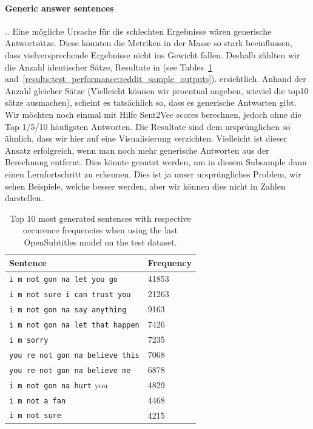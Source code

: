 \paragraph{Generic answer sentences}.. Eine mögliche Ursache für die schlechten Ergebnisse wären generische Antwortsätze. Diese könnten die Metriken in der Masse so stark beeinflussen, dass vielversprechende Ergebnisse nicht ins Gewicht fallen. Deshalb zählten wir die Anzahl identischer Sätze, Resultate in (see Tables~\ref{results:test_performance:opensubtitles_sample_outputs} and~\ref{results:test_performance:reddit_sample_outputs}). ersichtlich. Anhand der Anzahl gleicher Sätze (Vielleicht können wir proentual angeben, wieviel die top10 sätze ausmachen), scheint es tatsächlich so, dass es generische Antworten gibt. Wir möchten noch einmal mit Hilfe  Sent2Vec scores berechnen, jedoch ohne die Top 1/5/10 häufigsten Antworten. Die Resultate sind dem ursprünglichen so ähnlich, dass wir hier auf eine Visualisierung verzichten. Vielleicht ist dieser Ansatz erfolgreich, wenn man noch mehr generische Antworten aus der Berechnung entfernt. Dies könnte genutzt werden, um in diesem Subsample dann einen Lernfortschritt zu erkennen. Dies ist ja unser ursprüngliches Problem, wir sehen Beispiele, welche besser werden, aber wir können dies nicht in Zahlen darstellen.

\begin{table}[H]
	\centering
	\begin{adjustbox}{max width=\textwidth}
		\begin{tabular}{ll}
			\toprule
			Sentence & Frequency\\ \midrule
			\texttt{i m not gon na let you go} & 41853\\
			\texttt{i m not sure i can trust you} & 21263\\
			\texttt{i m not gon na say anything} & 9163\\
			\texttt{i m not gon na let that happen} & 7426\\
			\texttt{i m sorry} & 7235\\
			\texttt{you re not gon na believe this} & 7068\\
			\texttt{you re not gon na believe me} & 6878\\
			\texttt{i m not gon na hurt} you & 4829\\
			\texttt{i m not a fan} & 4468\\
			\texttt{i m not sure} & 4215\\
			\bottomrule
		\end{tabular}
	\end{adjustbox}
	\caption{Top 10 most generated sentences with respective occurence frequencies when using the last OpenSubtitles model on the test dataset.}
	\label{results:test_performance:opensubtitles_sample_outputs}
\end{table}

